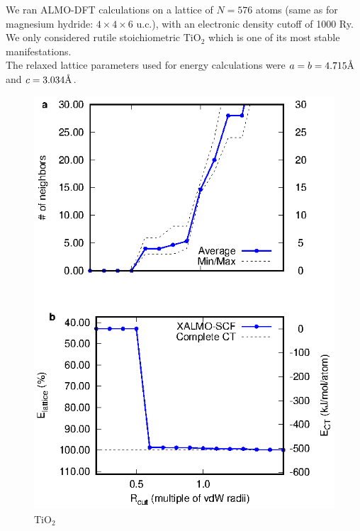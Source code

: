 \documentclass[aps,prb,twocolumn,amsmath,amssymb,superscriptaddress,longbibliography]{revtex4-1}
\newcommand{\angstrom}{\text{\normalfont\AA}}
\begin{document}
We ran ALMO-DFT calculations on a lattice of $N = 576$ atoms (same as for magnesium hydride: $4\times 4\times 6$ u.c.), with an electronic density cutoff of 1000 Ry. We only considered rutile stoichiometric $\text{TiO}_{2}$ which is one of its most stable manifestations.\\
The relaxed lattice parameters used for energy calculations were $a = b = 4.715\angstrom$ and $c = 3.034\angstrom$.\\


\begin{figure}
\includegraphics[scale=1]{plots/TiO2_EvR}
\caption{$\text{TiO}_{2}$}
\label{tio2graph}
\end{figure}
\end{document}
